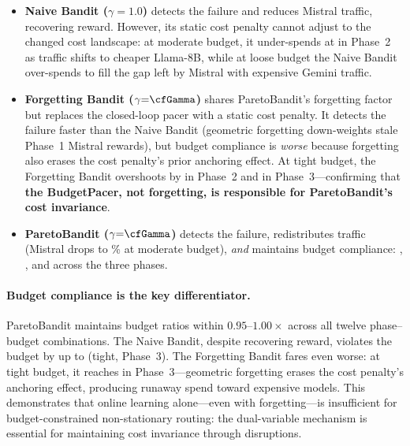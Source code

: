 \begin{itemize}[nosep,leftmargin=*]
  \item \textbf{Naive Bandit ($\gamma{=}1.0$)} detects the failure
    and reduces Mistral traffic, recovering reward.  However, its
    static cost penalty cannot adjust to the changed cost landscape:
    at moderate budget, it under-spends at \cfNaiveModPhaseTwoRatio{}
    in Phase~2 as traffic shifts to cheaper Llama-8B, while at loose
    budget the Naive Bandit over-spends to fill the gap left by
    Mistral with expensive Gemini traffic.
  \item \textbf{Forgetting Bandit ($\gamma{=}\cfGamma$)} shares
    ParetoBandit's forgetting factor but replaces the closed-loop
    pacer with a static cost penalty.  It detects the failure faster
    than the Naive Bandit (geometric forgetting down-weights stale
    Phase~1 Mistral rewards), but budget compliance is \emph{worse}
    because forgetting also erases the cost penalty's prior anchoring
    effect.  At tight budget, the Forgetting Bandit overshoots by
    \cfForgetTightPhaseTwoRatio{} in Phase~2 and
    \cfForgetTightPhaseThreeRatio{} in Phase~3---confirming that
    \textbf{the BudgetPacer, not forgetting, is responsible for
    ParetoBandit's cost invariance}.
  \item \textbf{ParetoBandit ($\gamma{=}\cfGamma$)} detects the failure,
    redistributes traffic (Mistral drops to
    \cfParetoBanditModMistralPhaseTwo\% at moderate budget), \emph{and}
    maintains budget compliance: \cfParetoBanditModPhaseOneRatio,
    \cfParetoBanditModPhaseTwoRatio, and
    \cfParetoBanditModPhaseThreeRatio{} across the three phases.
\end{itemize}

\paragraph{Budget compliance is the key differentiator.}
ParetoBandit maintains budget ratios within $0.95$--$1.00\times$
across all twelve phase--budget combinations.  The Naive Bandit, despite
recovering reward, violates the budget by up to
\cfNaiveTightPhaseThreeRatio{} (tight, Phase~3).  The Forgetting Bandit
fares even worse: at tight budget, it reaches
\cfForgetTightPhaseThreeRatio{} in Phase~3---geometric forgetting erases
the cost penalty's anchoring effect, producing runaway spend toward
expensive models.  This demonstrates that online learning alone---even
with forgetting---is insufficient for budget-constrained non-stationary
routing: the dual-variable mechanism is essential for maintaining cost
invariance through disruptions.

